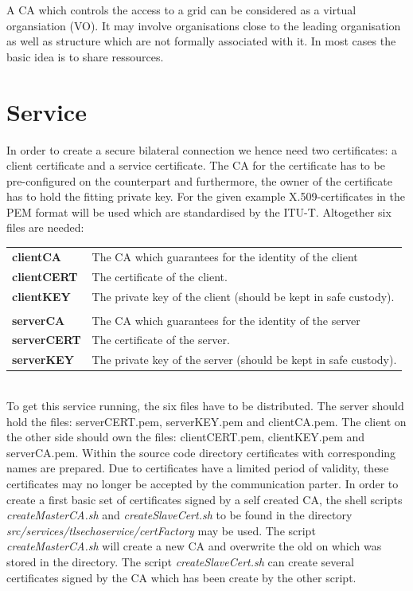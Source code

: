 A CA which controls the access to a grid can be considered as a virtual organsiation (VO).
It may involve organisations close to the leading organisation as well as structure which are not formally associated with it.
In most cases the basic idea is to share ressources. 

\clearpage
\section{Service}


In order to create a secure bilateral connection we hence need two certificates: a client certificate and a service certificate.
The CA for the certificate has to be pre-configured on the counterpart and furthermore, the owner of the certificate has to hold the fitting private key.
For the given example X.509-certificates in the PEM format will be used which are standardised by the ITU-T.
Altogether six files are needed:
\begin{tabular}{l@{~---~}p{13cm}}
\textbf{clientCA}   & The CA which guarantees for the identity of the client \\
\textbf{clientCERT} & The certificate of the client. \\
\textbf{clientKEY}  & The private key of the client (should be kept in safe custody).\\
\\
\textbf{serverCA}   & The CA which guarantees for the identity of the server \\
\textbf{serverCERT} & The certificate of the server. \\
\textbf{serverKEY}  & The private key of the server (should be kept in safe custody).\\
\end{tabular}
\forcelinebreak
\\

To get this service running, the six files have to be distributed. The server should hold the files: serverCERT.pem, serverKEY.pem and clientCA.pem. The client on the other side should own the files: clientCERT.pem, clientKEY.pem and serverCA.pem.
Within the source code directory certificates with corresponding names are prepared. Due to certificates have a limited period of validity, these certificates may no longer be accepted by the communication parter. In order to create a first basic set of certificates signed by a self created CA, the shell scripts \textit{createMasterCA.sh} and \textit{createSlaveCert.sh} to be found in the directory \textit{src/services/tlsechoservice/certFactory} may be used. The script \textit{createMasterCA.sh} will create a new CA and overwrite the old on which was stored in the directory. The script \textit{createSlaveCert.sh} can create several certificates signed by the CA which has been create by the other script.\\


